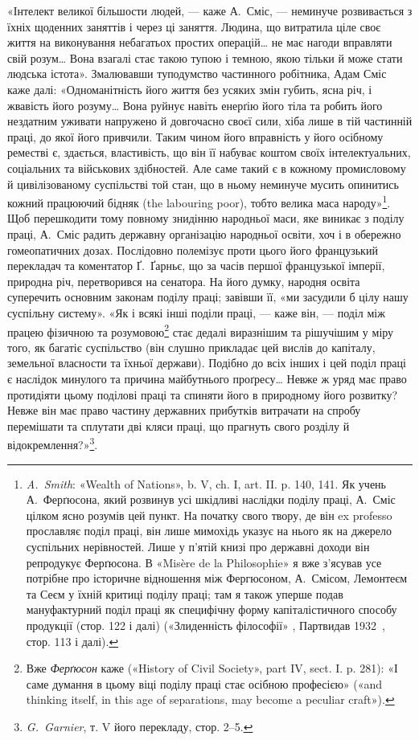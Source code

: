«Інтелект великої більшости людей, — каже А.~Сміс, — неминуче
розвивається з їхніх щоденних заняттів і через ці заняття.
Людина, що витратила ціле своє життя на виконування небагатьох
простих операцій\dots{} не має нагоди вправляти свій розум\dots{} Вона
взагалі стає такою тупою і темною, якою тільки й може стати
людська істота». Змалювавши туподумство частинного робітника,
Адам Сміс каже далі: «Одноманітність його життя без усяких
змін губить, ясна річ, і жвавість його розуму\dots{} Вона руйнує
навіть енерґію його тіла та робить його нездатним уживати напружено
й довгочасно своєї сили, хіба лише в тій частинній
праці, до якої його привчили. Таким чином його вправність у його
осібному реместві є, здається, властивість, що він її набуває коштом
своїх інтелектуальних, соціальних та військових здібностей.
Але саме такий є в кожному промисловому й цивілізованому
суспільстві той стан, що в ньому неминуче мусить опинитись
кожний працюючий бідняк (the labouring poor), тобто велика маса
народу»\footnote{
\emph{A.~Smith}: «Wealth of Nations», b. V, ch. I, art. II. p. 140, 141.
Як учень А.~Ферґюсона, який розвинув усі шкідливі наслідки поділу
праці, А.~Сміс цілком ясно розумів цей пункт. На початку свого твору,
де він ex professo прославляє поділ праці, він лише мимохідь указує на
нього як на джерело суспільних нерівностей. Лише у п’ятій книзі про
державні доходи він репродукує Ферґюсона. В «Misère de la Philosophie»
я вже з’ясував усе потрібне про історичне відношення між Фергюсоном,
А.~Смісом, Лемонтеєм та Сеєм у їхній критиці поділу праці; там
я також уперше подав мануфактурний поділ праці як специфічну форму
капіталістичного способу продукції (стор. 122 і далі) («Злиденність філософії»
, Партвидав 1932~, стор. 113 і далі).
}. Щоб перешкодити тому повному знидінню народньої
маси, яке виникає з поділу праці, А.~Сміс радить державну
організацію народньої освіти, хоч і в обережно гомеопатичних
дозах. Послідовно полемізує проти цього його французький
перекладач та коментатор Ґ.~Ґарньє, що за часів першої французької
імперії, природна річ, перетворився на сенатора. На його
думку, народня освіта суперечить основним законам поділу праці;
завівши її, «ми засудили б цілу нашу суспільну систему». «Як
і всякі інші поділи праці, — каже він, — поділ між працею фізичною
та розумовою\footnote{
Вже \emph{Ферґюсон} каже («History of Civil Society», part IV, sect. I.
p. 281): «І саме думання в цьому віці поділу праці стає осібною професією»
(«and thinking itself, in this age of separations, may become a peculiar
craft»).
} стає дедалі виразнішим та рішучішим у
міру того, як багатіє суспільство (він слушно прикладає цей
вислів до капіталу, земельної власности та їхньої держави).
Подібно до всіх інших і цей поділ праці є наслідок минулого та
причина майбутнього проґресу\dots{} Невже ж уряд має право протидіяти
цьому поділові праці та спиняти його в природному його
розвитку? Невже він має право частину державних прибутків
витрачати на спробу перемішати та сплутати дві кляси праці,
що прагнуть свого розділу й відокремлення?»\footnote{
\emph{G.~Garnier}, т. V його перекладу, стор. 2--5.
}.

